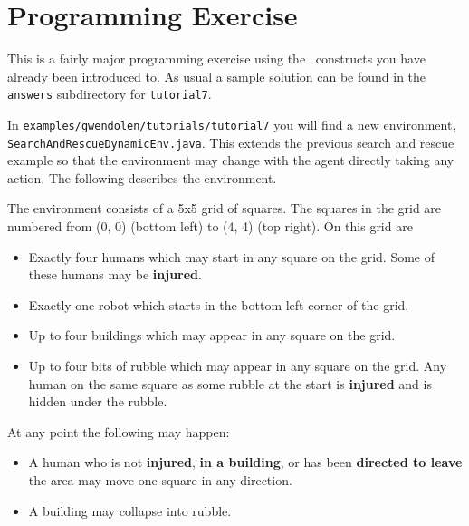 \section{Programming Exercise}
This is a fairly major programming exercise using the \gwendolen\ constructs you have already been introduced to.  As usual a sample solution can be found in the \texttt{answers} subdirectory for \texttt{tutorial7}.

In \texttt{examples/gwendolen/tutorials/tutorial7} you will find a new environment, \texttt{SearchAndRescueDynamicEnv.java}.  This extends the previous search and rescue example so that the environment may change with the agent directly taking any action.  The following describes the environment.

The environment consists of a 5x5 grid of squares.  The squares in the grid are numbered from (0, 0) (bottom left) to (4, 4) (top right).  On this grid are
\begin{itemize}
\item Exactly four humans which may start in any square on the grid.  Some of these humans may be {\bf injured}.
\item Exactly one robot which starts in the bottom left corner of the grid.
\item Up to four buildings which may appear in any square on the grid.
\item Up to four bits of rubble which may appear in any square on the grid.  Any human on the same square as some rubble at the start is {\bf injured} and is hidden under the rubble.
\end{itemize}

At any point the following may happen:
\begin{itemize}
\item A human who is not {\bf injured}, {\bf in a building}, or has been {\bf directed to leave} the area may move one square in any direction.
\item A building may collapse into rubble.
\end{itemize}

